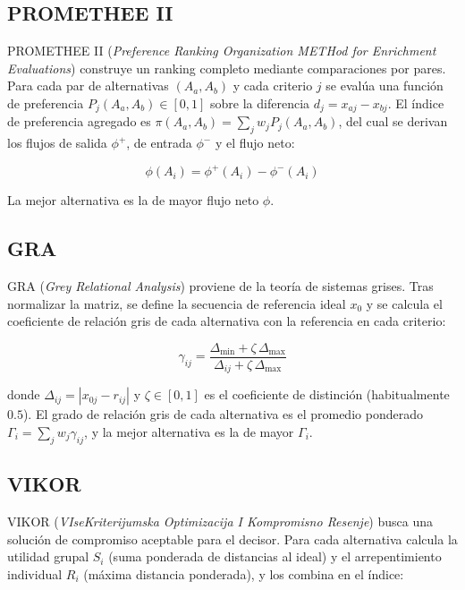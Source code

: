 \subsection{PROMETHEE II}

PROMETHEE II (\textit{Preference Ranking Organization METHod for Enrichment Evaluations}) \citep{Brans1985} construye un ranking completo mediante comparaciones por pares. Para cada par de alternativas $(A_a, A_b)$ y cada criterio $j$ se evalúa una función de preferencia $P_j(A_a, A_b) \in [0,1]$ sobre la diferencia $d_j = x_{aj} - x_{bj}$. El índice de preferencia agregado es $\pi(A_a, A_b) = \sum_j w_j P_j(A_a, A_b)$, del cual se derivan los flujos de salida $\phi^+$, de entrada $\phi^-$ y el flujo neto:

\begin{equation}
\phi(A_i) = \phi^+(A_i) - \phi^-(A_i)
\end{equation}

La mejor alternativa es la de mayor flujo neto $\phi$.

\subsection{GRA}

GRA (\textit{Grey Relational Analysis}) \citep{Deng1989} proviene de la teoría de sistemas grises. Tras normalizar la matriz, se define la secuencia de referencia ideal $x_0$ y se calcula el coeficiente de relación gris de cada alternativa con la referencia en cada criterio:

\begin{equation}
\gamma_{ij} = \frac{\Delta_{\min} + \zeta \, \Delta_{\max}}{\Delta_{ij} + \zeta \, \Delta_{\max}}
\end{equation}

donde $\Delta_{ij} = |x_{0j} - r_{ij}|$ y $\zeta \in [0,1]$ es el coeficiente de distinción (habitualmente $0.5$). El grado de relación gris de cada alternativa es el promedio ponderado $\Gamma_i = \sum_j w_j \gamma_{ij}$, y la mejor alternativa es la de mayor $\Gamma_i$.

\subsection{VIKOR}

VIKOR (\textit{VIseKriterijumska Optimizacija I Kompromisno Resenje}) \citep{Opricovic2004} busca una solución de compromiso aceptable para el decisor. Para cada alternativa calcula la utilidad grupal $S_i$ (suma ponderada de distancias al ideal) y el arrepentimiento individual $R_i$ (máxima distancia ponderada), y los combina en el índice:


